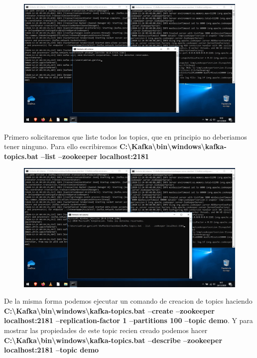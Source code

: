 \documentclass[a4paper,10pt]{article}
\begin{document}
\begin{figure}[H]
\begin{center}
\includegraphics[width=450pt]{./fotos/Kafka/10.jpg}
\end{center}
\end{figure}

Primero solicitaremos que liste todos los topics, que en principio no deberiamos tener ninguno. Para ello escribiremos \textbf{C:\textbackslash Kafka\textbackslash bin\textbackslash windows\textbackslash kafka-topics.bat --list --zookeeper localhost:2181} 

\begin{figure}[H]
\begin{center}
\includegraphics[width=450pt]{./fotos/Kafka/11.jpg}
\end{center}
\end{figure}

De la misma forma podemos ejecutar un comando de creacion de topics haciendo \textbf{C:\textbackslash Kafka\textbackslash bin\textbackslash windows\textbackslash kafka-topics.bat --create --zookeeper localhost:2181 --replication-factor 1 --partitions 100 --topic demo}. Y para mostrar las propiedades de este topic recien creado podemos hacer \textbf{C:\textbackslash Kafka\textbackslash bin\textbackslash windows\textbackslash kafka-topics.bat --describe --zookeeper localhost:2181 --topic demo}
\end{document}
